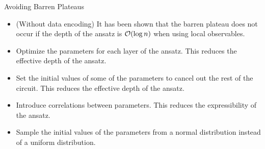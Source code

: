 \documentclass[dvipdfmx,10pt,aspectratio=169]{beamer}
\begin{document}
\begin{frame}{Avoiding Barren Plateaus}
    \begin{itemize}
        \item (Without data encoding) It has been shown that the barren plateau does not occur if the depth of the ansatz is $\order{\log{n}}$ when using local observables. %
        \item Optimize the parameters for each layer of the ansatz. This reduces the effective depth of the ansatz. %
        \item Set the initial values of some of the parameters to cancel out the rest of the circuit. This reduces the effective depth of the ansatz. %
        \item Introduce correlations between parameters. This reduces the expressibility of the ansatz. %
        \item Sample the initial values of the parameters from a normal distribution instead of a uniform distribution. %
    \end{itemize}
\end{frame}
\end{document}

